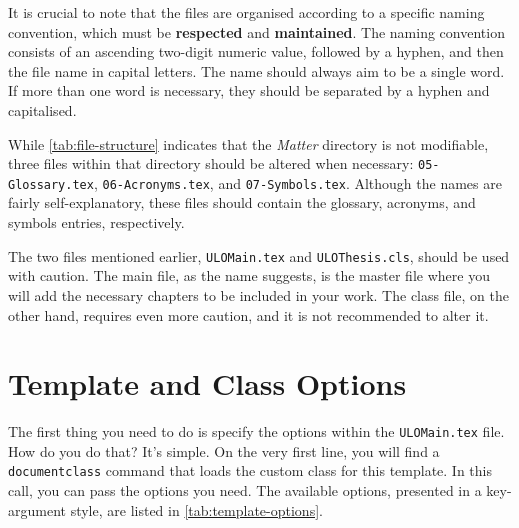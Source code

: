 It is crucial to note that the files are organised according to a specific naming convention, which must be \textbf{respected} and \textbf{maintained}. The naming convention consists of an ascending two-digit numeric value, followed by a hyphen, and then the file name in capital letters. The name should always aim to be a single word. If more than one word is necessary, they should be separated by a hyphen and capitalised.

\begin{block}[note]
While \autoref{tab:file-structure} indicates that the \textit{Matter} directory is not modifiable, three files within that directory should be altered when necessary: \texttt{05-Glossary.tex}, \texttt{06-Acronyms.tex}, and \texttt{07-Symbols.tex}. Although the names are fairly self-explanatory, these files should contain the glossary, acronyms, and symbols entries, respectively.
\end{block}

The two files mentioned earlier, \texttt{ULOMain.tex} and \texttt{ULOThesis.cls}, should be used with caution. The main file, as the name suggests, is the master file where you will add the necessary chapters to be included in your work. The class file, on the other hand, requires even more caution, and it is not recommended to alter it.

\section{Template and Class Options}
\label{sec:class-options}
The first thing you need to do is specify the options within the \texttt{ULOMain.tex} file. How do you do that? It's simple. On the very first line, you will find a \texttt{documentclass} command that loads the custom class for this template. In this call, you can pass the options you need. The available options, presented in a key-argument style, are listed in \autoref{tab:template-options}.

